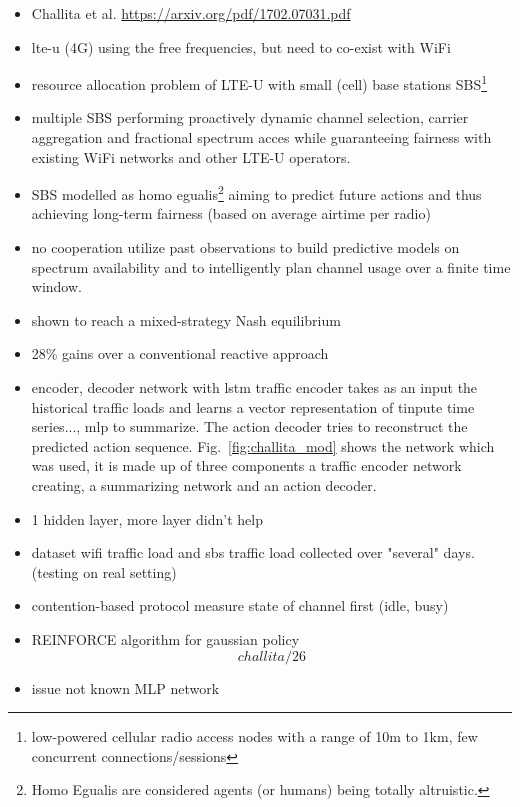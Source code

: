 \iffalse
\begin{itemize}
    \item Challita et al. \url{https://arxiv.org/pdf/1702.07031.pdf}
    \item \gls{lte-u} (4G) \follows using the free frequencies, but need to co-exist with WiFi
    \item resource allocation problem of LTE-U with small (cell) base stations SBS\footnote{low-powered cellular radio access nodes with a range of 10m to 1km, few concurrent connections/sessions}
    \item multiple SBS performing proactively dynamic channel selection, carrier aggregation and fractional spectrum acces while guaranteeing fairness with existing WiFi networks and other LTE-U operators.
    \item SBS modelled as homo egualis\footnote{Homo Egualis are considered agents (or humans) being totally altruistic.\cite{arslan2007cognitive}} aiming to predict future actions and thus achieving long-term fairness (based on average airtime per radio)
    \item no cooperation \follows utilize past observations to build predictive models on spectrum availability and to intelligently plan channel usage over a finite time window.
    \item shown to reach a mixed-strategy Nash equilibrium
    \item 28\% gains over a conventional reactive approach
    \item encoder, decoder network with lstm \follows traffic encoder takes as an input the historical traffic loads and learns a vector representation of tinpute time series..., mlp to summarize. The action decoder tries to reconstruct the predicted action sequence. Fig.~\ref{fig:challita_mod} shows the network which was used, it is made up of three components a traffic encoder network creating, a summarizing network and an action decoder. 
    \item 1 hidden layer, more layer didn't help
    \item dataset wifi traffic load and sbs traffic load collected over "several" days. (testing on real setting)
    \item contention-based protocol \follows measure state of channel first (idle, busy)
    \item REINFORCE algorithm for gaussian policy \[challita/26\]
    \item issue not known MLP network
\end{itemize}
